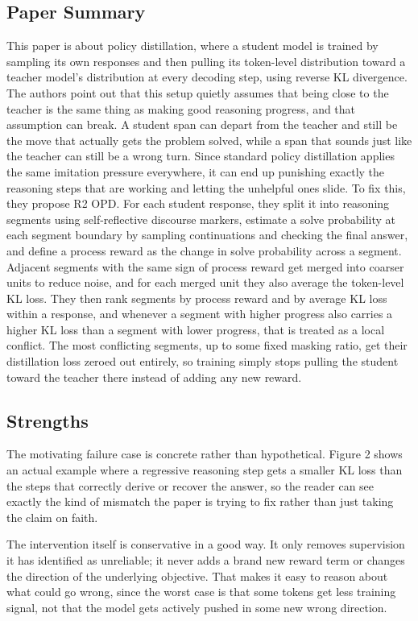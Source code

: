 \documentclass[11pt,a4paper]{article}
\begin{document}
\subsection*{Paper Summary}
This paper is about policy distillation, where a student model is trained by sampling its own responses and then pulling its token-level distribution toward a teacher model's distribution at every decoding step, using reverse KL divergence. The authors point out that this setup quietly assumes that being close to the teacher is the same thing as making good reasoning progress, and that assumption can break. A student span can depart from the teacher and still be the move that actually gets the problem solved, while a span that sounds just like the teacher can still be a wrong turn. Since standard policy distillation applies the same imitation pressure everywhere, it can end up punishing exactly the reasoning steps that are working and letting the unhelpful ones slide. To fix this, they propose R2 OPD. For each student response, they split it into reasoning segments using self-reflective discourse markers, estimate a solve probability at each segment boundary by sampling continuations and checking the final answer, and define a process reward as the change in solve probability across a segment. Adjacent segments with the same sign of process reward get merged into coarser units to reduce noise, and for each merged unit they also average the token-level KL loss. They then rank segments by process reward and by average KL loss within a response, and whenever a segment with higher progress also carries a higher KL loss than a segment with lower progress, that is treated as a local conflict. The most conflicting segments, up to some fixed masking ratio, get their distillation loss zeroed out entirely, so training simply stops pulling the student toward the teacher there instead of adding any new reward.

\subsection*{Strengths}
The motivating failure case is concrete rather than hypothetical. Figure 2 shows an actual example where a regressive reasoning step gets a smaller KL loss than the steps that correctly derive or recover the answer, so the reader can see exactly the kind of mismatch the paper is trying to fix rather than just taking the claim on faith.

The intervention itself is conservative in a good way. It only removes supervision it has identified as unreliable; it never adds a brand new reward term or changes the direction of the underlying objective. That makes it easy to reason about what could go wrong, since the worst case is that some tokens get less training signal, not that the model gets actively pushed in some new wrong direction.
\end{document}
